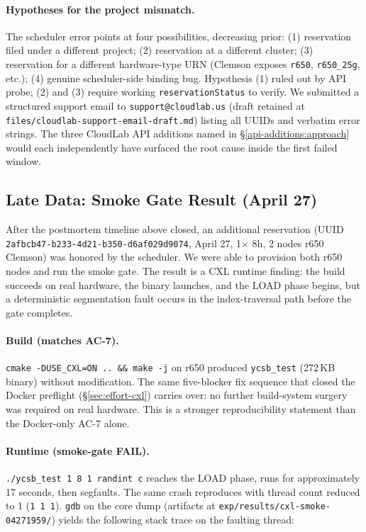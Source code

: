 \documentclass[11pt,a4paper]{article}
\begin{document}
\paragraph{Hypotheses for the project mismatch.} The scheduler error points at four possibilities, decreasing prior: (1) reservation filed under a different project; (2) reservation at a different cluster; (3) reservation for a different hardware-type URN (Clemson exposes \texttt{r650}, \texttt{r650\_25g}, etc.); (4) genuine scheduler-side binding bug. Hypothesis (1) ruled out by API probe; (2) and (3) require working \texttt{reservationStatus} to verify. We submitted a structured support email to \texttt{support@cloudlab.us} (draft retained at \texttt{files/cloudlab-support-email-draft.md}) listing all UUIDs and verbatim error strings. The three CloudLab API additions named in §\ref{api-additions:approach} would each independently have surfaced the root cause inside the first failed window.

\subsection{Late Data: Smoke Gate Result (April 27)}
\label{sec:late-data}

After the postmortem timeline above closed, an additional reservation (UUID \texttt{2afbcb47-b233-4d21-b350-d6af029d9074}, April 27, 1$\times$ 8h, 2 nodes r650 Clemson) was honored by the scheduler. We were able to provision both r650 nodes and run the smoke gate. The result is a CXL runtime finding: the build succeeds on real hardware, the binary launches, and the LOAD phase begins, but a deterministic segmentation fault occurs in the index-traversal path before the gate completes.

\paragraph{Build (matches AC-7).} \texttt{cmake -DUSE\_CXL=ON .. \&\& make -j} on r650 produced \texttt{ycsb\_test} (272\,KB binary) without modification. The same five-blocker fix sequence that closed the Docker preflight (\S\ref{sec:effort-cxl}) carries over: no further build-system surgery was required on real hardware. This is a stronger reproducibility statement than the Docker-only AC-7 alone.

\paragraph{Runtime (smoke-gate FAIL).} \texttt{./ycsb\_test 1 8 1 randint c} reaches the LOAD phase, runs for approximately 17 seconds, then segfaults. The same crash reproduces with thread count reduced to 1 (\texttt{1 1 1}). \texttt{gdb} on the core dump (artifacts at \texttt{exp/results/cxl-smoke-04271959/}) yields the following stack trace on the faulting thread:
\end{document}
